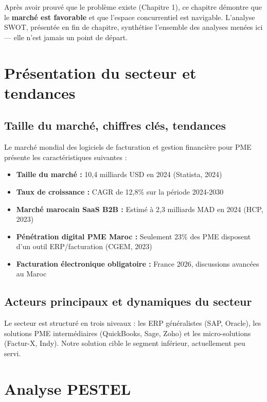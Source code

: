 \documentclass[12pt,a4paper]{report}
\begin{document}
Après avoir prouvé que le problème existe (Chapitre 1), ce chapitre démontre que le \textbf{marché est favorable} et que l'espace concurrentiel est navigable. L'analyse SWOT, présentée en fin de chapitre, synthétise l'ensemble des analyses menées ici — elle n'est jamais un point de départ.

\section{Présentation du secteur et tendances}

\subsection{Taille du marché, chiffres clés, tendances}

Le marché mondial des logiciels de facturation et gestion financière pour PME présente les caractéristiques suivantes :

\begin{itemize}
    \item \textbf{Taille du marché :} 10,4 milliards USD en 2024 (Statista, 2024)
    \item \textbf{Taux de croissance :} CAGR de 12,8\% sur la période 2024-2030
    \item \textbf{Marché marocain SaaS B2B :} Estimé à 2,3 milliards MAD en 2024 (HCP, 2023)
    \item \textbf{Pénétration digital PME Maroc :} Seulement 23\% des PME disposent d'un outil ERP/facturation (CGEM, 2023)
    \item \textbf{Facturation électronique obligatoire :} France 2026, discussions avancées au Maroc
\end{itemize}

\subsection{Acteurs principaux et dynamiques du secteur}

Le secteur est structuré en trois niveaux : les ERP généralistes (SAP, Oracle), les solutions PME intermédiaires (QuickBooks, Sage, Zoho) et les micro-solutions (Factur-X, Indy). Notre solution cible le segment inférieur, actuellement peu servi.

\section{Analyse PESTEL}
\end{document}
